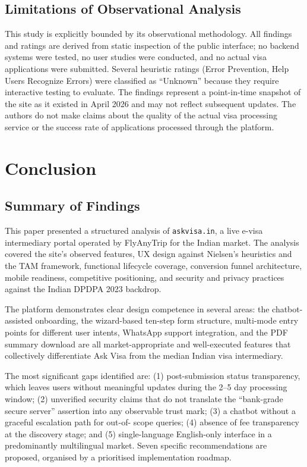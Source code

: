\documentclass[journal, 10pt, twoside]{IEEEtran}
\begin{document}
\subsection{Limitations of Observational Analysis}
This study is explicitly bounded by its observational methodology. All
findings and ratings are derived from static inspection of the public
interface; no backend systems were tested, no user studies were conducted,
and no actual visa applications were submitted. Several heuristic ratings
(Error Prevention, Help Users Recognize Errors) were classified as
``Unknown'' because they require interactive testing to evaluate. The
findings represent a point-in-time snapshot of the site as it existed in
April 2026 and may not reflect subsequent updates. The authors do not make
claims about the quality of the actual visa processing service or the
success rate of applications processed through the platform.



\section{Conclusion}
\label{sec:conclusion}

\subsection{Summary of Findings}
This paper presented a structured analysis of \texttt{askvisa.in}, a live
e-visa intermediary portal operated by FlyAnyTrip for the Indian market.
The analysis covered the site's observed features, UX design against
Nielsen's heuristics and the TAM framework, functional lifecycle coverage,
conversion funnel architecture, mobile readiness, competitive positioning,
and security and privacy practices against the Indian DPDPA 2023 backdrop.

The platform demonstrates clear design competence in several areas: the
chatbot-assisted onboarding, the wizard-based ten-step form structure,
multi-mode entry points for different user intents, WhatsApp support
integration, and the PDF summary download are all market-appropriate and
well-executed features that collectively differentiate Ask Visa from the
median Indian visa intermediary.

The most significant gaps identified are: (1) post-submission status
transparency, which leaves users without meaningful updates during the
2--5 day processing window; (2) unverified security claims that do not
translate the ``bank-grade secure server'' assertion into any observable
trust mark; (3) a chatbot without a graceful escalation path for out-of-
scope queries; (4) absence of fee transparency at the discovery stage;
and (5) single-language English-only interface in a predominantly multilingual
market. Seven specific recommendations are proposed, organised by a
prioritised implementation roadmap.
\end{document}
